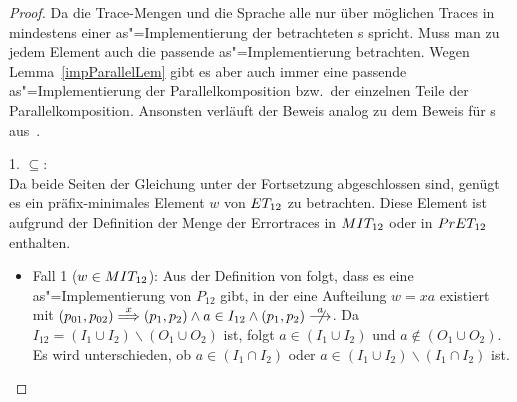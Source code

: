 \begin{proof}
  Da die Trace-Mengen und die Sprache alle nur über möglichen Traces in
  mindestens einer as"=Implementierung der betrachteten \MEIO{}s spricht. Muss
  man zu jedem Element auch die passende as"=Implementierung betrachten. Wegen
  Lemma~\ref{impParallelLem} gibt es aber auch immer eine passende
  as"=Implementierung der Parallelkomposition bzw.\ der einzelnen Teile der
  Parallelkomposition. Ansonsten verläuft der Beweis analog zu dem Beweis für
  \EIO{}s aus~\cite{Schinko2016BA}.

  1. \glqq$\subseteq$\grqq{}:\\
  Da beide Seiten der Gleichung unter der Fortsetzung \cont{} abgeschlossen
  sind, genügt es ein präfix-minimales Element $w$ von $ET _{12}$ zu
  betrachten. Diese Element ist aufgrund der Definition der Menge der
  Errortraces in $MIT _{12}$ oder in $PrET _{12}$ enthalten.
  \begin{itemize}
    \item Fall 1 ($w\in MIT _{12}$): Aus der Definition von \MIT{} folgt, dass
      es eine as"=Implementierung von $P_{12}$ gibt, in der eine Aufteilung
      $w=xa$ existiert mit $(p_{01},p_{02}) \weakmust[x] (p_1,p_2) \land a
      \in I_{12} \land (p_1,p_2) \nmust[a]$. Da $I_{12} = (I_1\cup I_2)
      \backslash (O_1\cup O_2)$ ist, folgt $a\in (I_1\cup I_2)$ und $a\notin
      (O_1\cup O_2)$. Es wird unterschieden, ob $a\in (I_1\cap I_2)$ oder $a\in
      (I_1\cup I_2) \backslash (I_1\cap I_2)$ ist.
\end{itemize}
\end{proof}
